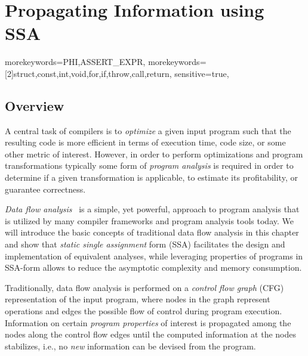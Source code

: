 \providecommand\lcode{\begingroup \small\urlstyle{tt}\Url}
\providecommand\lident{\begingroup \small\urlstyle{tt}\Url}

\chapter{Propagating Information using SSA}

\newcommand{\obacht}[2]{\marginpar{\tiny\textbf{#1:} #2}}

\graphicspath{{img/}{constant_propagation_is_easier/img/}{part3/constant_propagation_is_easier/img/}}

{
  morekeywords={PHI,ASSERT_EXPR},
  morekeywords=[2]{struct,const,int,void,for,if,throw,call,return},
  sensitive=true,
}

\lstset{
  mathescape=true,
  language=DNlisting,
  basicstyle=\small,
  keywordstyle=\ttfamily,
  keywordstyle=[2]\bfseries,
}

\section{Overview}

A central task of compilers is to \emph{optimize} a given input program such
that the resulting code is more efficient in terms of execution time, code size,
or some other metric of interest. However, in order to perform optimizations and
program transformations typically some form of \emph{program analysis} is
required in order to determine if a given transformation is applicable, to
estimate its profitability, or guarantee correctness.

\emph{Data flow analysis}~\cite{novillo:bib:NNH99} is a simple, yet powerful,
approach to program analysis that is utilized by many compiler frameworks and
program analysis tools today. We will introduce the basic concepts of
traditional data flow analysis in this chapter and show that \emph{static single
assignment} form (SSA) facilitates the design and implementation of equivalent
analyses, while leveraging properties of programs in SSA-form allows to reduce
the asymptotic complexity and memory consumption.

Traditionally, data flow analysis is performed on a \emph{control flow graph}
(CFG) representation of the input program, where nodes in the graph represent
operations and edges the possible flow of control during program execution.
Information on certain \emph{program properties} of interest is propagated among
the nodes along the control flow edges until the computed information at the
nodes stabilizes, i.e., no \emph{new} information can be devised from the
program.

